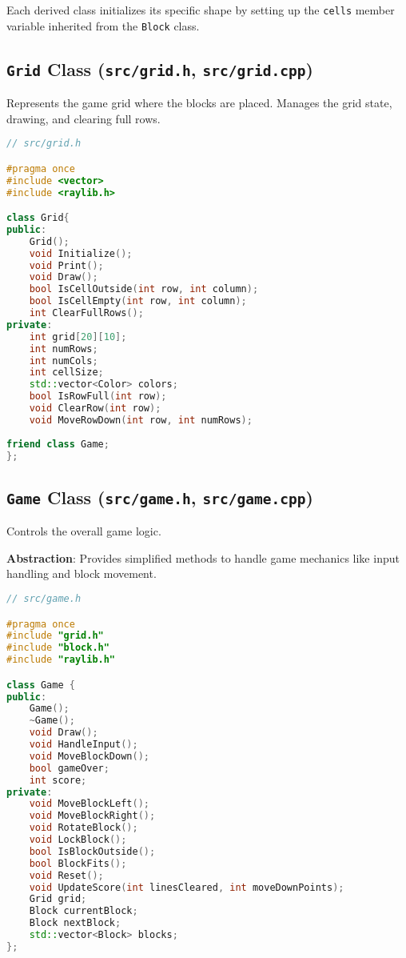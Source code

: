 \documentclass{article}
\begin{document}
Each derived class initializes its specific shape by setting up the \texttt{cells} member variable inherited from the \texttt{Block} class.

\subsection{\texttt{Grid} Class (\texttt{src/grid.h}, \texttt{src/grid.cpp})}

Represents the game grid where the blocks are placed. Manages the grid state, drawing, and clearing full rows.

\begin{lstlisting}[language=C++]
// src/grid.h

#pragma once
#include <vector>
#include <raylib.h>

class Grid{
public:
    Grid();
    void Initialize();
    void Print();
    void Draw();
    bool IsCellOutside(int row, int column);
    bool IsCellEmpty(int row, int column);
    int ClearFullRows();
private:
    int grid[20][10];
    int numRows;
    int numCols;
    int cellSize;
    std::vector<Color> colors;
    bool IsRowFull(int row);
    void ClearRow(int row);
    void MoveRowDown(int row, int numRows);
    
friend class Game;
};
\end{lstlisting}

\subsection{\texttt{Game} Class (\texttt{src/game.h}, \texttt{src/game.cpp})}

Controls the overall game logic.

\textbf{Abstraction}: Provides simplified methods to handle game mechanics like input handling and block movement.

\begin{lstlisting}[language=C++]
// src/game.h

#pragma once
#include "grid.h"
#include "block.h"
#include "raylib.h"

class Game {
public:
    Game();
    ~Game();
    void Draw();
    void HandleInput();
    void MoveBlockDown();
    bool gameOver;
    int score;
private:
    void MoveBlockLeft();
    void MoveBlockRight();
    void RotateBlock();
    void LockBlock();
    bool IsBlockOutside();
    bool BlockFits();
    void Reset();
    void UpdateScore(int linesCleared, int moveDownPoints);
    Grid grid;
    Block currentBlock;
    Block nextBlock;
    std::vector<Block> blocks;
};
\end{lstlisting}
\end{document}
